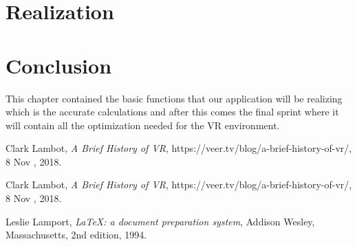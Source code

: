 \documentclass[]{report}
\begin{document}
\section{Realization}


\section{Conclusion}

This chapter contained the basic functions that our application will be realizing which is the accurate calculations and after this comes the final sprint where it will contain all the optimization needed for the VR environment.



\begin{thebibliography}{9}
	
	Clark Lambot,
	\textit{A Brief History of VR},
	https://veer.tv/blog/a-brief-history-of-vr/,
	8 Nov , 2018.
	
	Clark Lambot,
	\textit{A Brief History of VR},
	https://veer.tv/blog/a-brief-history-of-vr/,
	8 Nov , 2018.
	
	Leslie Lamport,
	\textit{\LaTeX: a document preparation system},
	Addison Wesley, Massachusetts,
	2nd edition,
	1994.
	
\end{thebibliography}
\end{document}
